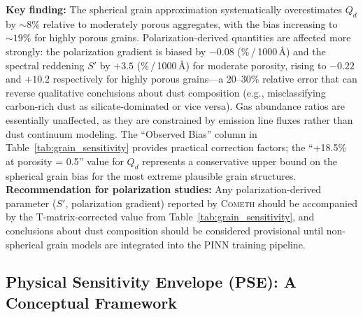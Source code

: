 \documentclass[usenatbib]{mnras}
\begin{document}
\textbf{Key finding:} The spherical grain approximation systematically overestimates $Q_d$ by $\sim 8\%$ relative to moderately porous aggregates, with the bias increasing to $\sim 19\%$ for highly porous grains. Polarization-derived quantities are affected more strongly: the polarization gradient is biased by $-0.08$ (\%\,/\,1000\,\AA) and the spectral reddening $S'$ by $+3.5$ (\%\,/\,1000\,\AA) for moderate porosity, rising to $-0.22$ and $+10.2$ respectively for highly porous grains---a 20--30\% relative error that can reverse qualitative conclusions about dust composition (e.g., misclassifying carbon-rich dust as silicate-dominated or vice versa). Gas abundance ratios are essentially unaffected, as they are constrained by emission line fluxes rather than dust continuum modeling. The ``Observed Bias'' column in Table~\ref{tab:grain_sensitivity} provides practical correction factors; the ``+18.5\% at porosity = 0.5'' value for $Q_d$ represents a conservative upper bound on the spherical grain bias for the most extreme plausible grain structures. \textbf{Recommendation for polarization studies:} Any polarization-derived parameter ($S'$, polarization gradient) reported by \textsc{Cometh} should be accompanied by the T-matrix-corrected value from Table~\ref{tab:grain_sensitivity}, and conclusions about dust composition should be considered provisional until non-spherical grain models are integrated into the PINN training pipeline.

\subsection{Physical Sensitivity Envelope (PSE): A Conceptual Framework}\label{sec:pse}

\begin{quote}
\noindent{}
\end{quote}
\end{document}
